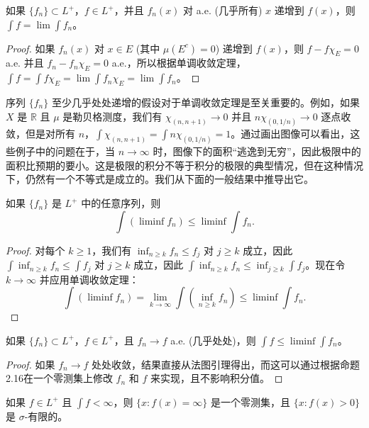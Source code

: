 \documentclass[lang=cn,10pt,thmcnt=section]{elegantbook}
\begin{document}
\begin{corollary}\label{corollary2.17}
如果 $\{f_n\} \subset L^+$，$f \in L^+$，并且 $f_n(x)$ 对 a.e. (几乎所有) $x$ 递增到 $f(x)$，则 $\int f = \lim \int f_n$。
\end{corollary}

\begin{proof}
如果 $f_n(x)$ 对 $x \in E$ (其中 $\mu(E^c)=0$) 递增到 $f(x)$，则 $f - f\chi_E=0$ a.e. 并且 $f_n - f_n\chi_E=0$ a.e.，所以根据单调收敛定理，$\int f = \int f\chi_E = \lim \int f_n\chi_E = \lim \int f_n$。
\end{proof}


序列 $\{f_n\}$ 至少几乎处处递增的假设对于单调收敛定理是至关重要的。例如，如果 $X$ 是 $\mathbb{R}$ 且 $\mu$ 是勒贝格测度，我们有 $\chi_{(n,n+1)} \to 0$ 并且 $n\chi_{(0,1/n)} \to 0$ 逐点收敛，但是对所有 $n$，$\int \chi_{(n,n+1)} = \int n\chi_{(0,1/n)} = 1$。通过画出图像可以看出，这些例子中的问题在于，当 $n \to \infty$ 时，图像下的面积“逃逸到无穷”，因此极限中的面积比预期的要小。这是极限的积分不等于积分的极限的典型情况，但在这种情况下，仍然有一个不等式是成立的。我们从下面的一般结果中推导出它。

\begin{lemma}[法图引理]\label{lemma2.18}
如果 $\{f_n\}$ 是 $L^+$ 中的任意序列，则
\[ \int (\liminf f_n) \le \liminf \int f_n. \]
\end{lemma}

\begin{proof}
对每个 $k \ge 1$，我们有 $\inf_{n \ge k} f_n \le f_j$ 对 $j \ge k$ 成立，因此 $\int \inf_{n \ge k} f_n \le \int f_j$ 对 $j \ge k$ 成立，因此 $\int \inf_{n \ge k} f_n \le \inf_{j \ge k} \int f_j$。现在令 $k \to \infty$ 并应用单调收敛定理：
\[ \int(\liminf f_n) = \lim_{k\to\infty} \int(\inf_{n\ge k} f_n) \le \liminf \int f_n. \]
\end{proof}

\begin{corollary}\label{corollary2.19}
如果 $\{f_n\} \subset L^+$，$f \in L^+$，且 $f_n \to f$ a.e. (几乎处处)，则 $\int f \le \liminf \int f_n$。
\end{corollary}

\begin{proof}
如果 $f_n \to f$ 处处收敛，结果直接从法图引理得出，而这可以通过根据命题2.16在一个零测集上修改 $f_n$ 和 $f$ 来实现，且不影响积分值。
\end{proof}

\begin{proposition}\label{proposition2.20}
如果 $f \in L^+$ 且 $\int f < \infty$，则 $\{x : f(x) = \infty\}$ 是一个零测集，且 $\{x : f(x) > 0\}$ 是 $\sigma$-有限的。
\end{proposition}
\end{document}
